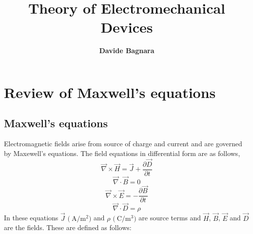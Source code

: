 \documentclass[11pt,a4paper,oneside]{book}
\title{\textbf{Theory of Electromechanical Devices}}
\author{\textbf{Davide Bagnara}}
\numberwithin{equation}{section}
\theoremstyle{it}
\theoremstyle{definition}
\begin{document}
	\thispagestyle{firstpage}
	\begin{mybox}
		\maketitle
		\vspace{145mm}
	\end{mybox}
	\newpage
	\tableofcontents
	\listoffigures	
	\listoftables

\chapter{Review of Maxwell's equations}
\section{Maxwell's equations}
Electromagnetic fields arise from source of charge and current and are governed by Maxewell's equations. The field equations in differential form are as follows,
 \begin{equation}\label{maxwell_1}
 	\vec{\nabla}\times\vec{H}=\vec{J} + \frac{\partial \vec{D}}{\partial t}
 \end{equation}
\begin{equation}\label{maxwell_2}
	\vec{\nabla}\cdot\vec{B}=0
\end{equation}
 \begin{equation}\label{maxwell_3}
	\vec{\nabla}\times\vec{E}=- \frac{\partial \vec{B}}{\partial t}
\end{equation}
\begin{equation}\label{maxwell_4}
	\vec{\nabla}\cdot\vec{D}=\rho
\end{equation}
In these equations $\vec{J}$ $\big(\SI{}{\ampere\per\square\meter}\big)$ and $\rho$ $\big(\SI{}{\coulomb\per\cubic\meter}\big)$ are source terms and $\vec{H}$, $\vec{B}$, $\vec{E}$ and $\vec{D}$ are the fields. These are defined as follows:
\begin{center}
\end{center}
\end{document}
